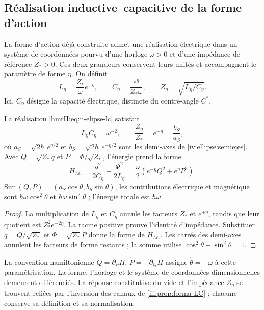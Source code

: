 \subsection{Réalisation inductive--capacitive de la forme d’action}
\label{nuclear:realizacion-lc}

La forme d’action déjà construite admet une réalisation électrique dans
un système de coordonnées pourvu d’une horloge \(\omega>0\) et d’une impédance de
référence \(Z_*>0\). Ces deux grandeurs conservent leurs unités et
accompagnent le paramètre de forme \(\eta\). On définit
\begin{equation}
 L_\eta=\frac{Z_*}{\omega}e^{-\eta},\qquad
 C_\eta=\frac{e^\eta}{Z_*\omega},\qquad
 Z_\eta=\sqrt{L_\eta/C_\eta}.
 \label{hmtII:eq:ii-elipse-lc}
\end{equation}
Ici, \(C_\eta\) désigne la capacité électrique, distincte du contre-angle \(C^*\).


\begin{proposition}
\label{nuclear:lc-producto}
La réalisation \eqref{hmtII:eq:ii-elipse-lc} satisfait
\begin{equation}
 L_\eta C_\eta=\omega^{-2},\qquad
 \frac{Z_\eta}{Z_*}=e^{-\eta}=\frac{b_S}{a_S},
 \label{hmtII:eq:ii-elipse-impedancia}
\end{equation}
où \(a_S=\sqrt{2\hbar}\,e^{\eta/2}\) et
\(b_S=\sqrt{2\hbar}\,e^{-\eta/2}\) sont les demi-axes de
\cref{iv:ellipse:semiejes}.
Avec \(Q=\sqrt{Z_*}q\) et \(P=\Phi/\sqrt{Z_*}\), l’énergie prend la forme
\[
 H_{LC}=\frac{q^2}{2C_\eta}+\frac{\Phi^2}{2L_\eta}
       =\frac\omega2(e^{-\eta}Q^2+e^\eta P^2).
\]
Sur \((Q,P)=(a_S\cos\theta,b_S\sin\theta)\), les contributions
électrique et magnétique sont \(\hbar\omega\cos^2\theta\) et
\(\hbar\omega\sin^2\theta\) ; l’énergie totale est \(\hbar\omega\).

\end{proposition}
\begin{proof}
La multiplication de \(L_\eta\) et \(C_\eta\) annule les facteurs
\(Z_*\) et \(e^{\pm\eta}\), tandis que leur quotient est
\(Z_*^2e^{-2\eta}\). La racine positive prouve l’identité d’impédance.
Substituer \(q=Q/\sqrt{Z_*}\) et \(\Phi=\sqrt{Z_*}P\) donne la forme
de \(H_{LC}\). Les carrés des demi-axes annulent les facteurs
de forme restants ; la somme utilise \(\cos^2\theta+\sin^2\theta=1\).
\end{proof}

La convention hamiltonienne
\(\dot Q=\partial_PH\), \(\dot P=-\partial_QH\) assigne
\(\dot\theta=-\omega\) à cette paramétrisation. La forme, l’horloge
et le système de coordonnées dimensionnelles demeurent différenciés. La réponse
constitutive du vide et l’impédance \(Z_\eta\) se trouvent reliées
par l’inversion des canaux de \cref{iii:prop:forma-LC} ; chacune
conserve sa définition et sa normalisation.
